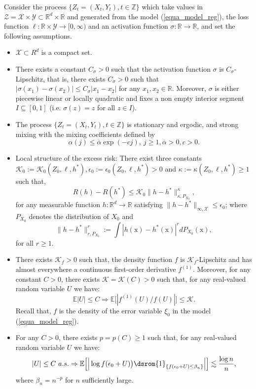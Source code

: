\documentclass[10pt,twoside]{article}
\numberwithin{equation}{section}
\newcommand{\E}{\ensuremath{\mathbb{E}}}
\newcommand{\R}{\ensuremath{\mathbb{R}}}
\newcommand{\Z}{\ensuremath{\mathbb{Z}}}
\def \ind{\textrm{\dsrom{1}}}
\newcommand{\mk}{ { \mathcal{K}} }
\newcommand{\mx}{ { \mathcal{X}} }
\begin{document}
Consider the process $\{ Z_t=(X_t, Y_t), t \in \Z \}$ which take values in $ \mathcal{Z}=   \mathcal{X} \times \mathcal{Y} \subset \R^d \times \R$ and generated from the model (\ref{equa_model_reg}), the loss function 
%
$\ell : \R \times \mathcal{Y} \to [0, \infty)$ and an activation function $\sigma: \R \rightarrow \R $, and set the following assumptions. 
%
\begin{itemize}
%
\item[\textbf{(A0)}:] $\mathcal{X}\subset R^d$ is a compact set.
%
\item[\textbf{(A1)}:] There exists a constant $C_{\sigma}>0$ such that the activation function $\sigma$ is $C_{\sigma}$-Lipschitz, that is, there exists $C_{\sigma} > 0$ such that $|\sigma(x_1) - \sigma(x_2)| \leq C_{\sigma} |x_1 - x_2|$ for any $x_1, x_2 \in \R$.
%
Moreover, $\sigma$ is  either piecewise linear or locally quadratic and fixes a non empty interior segment $I \subseteq [0,1]$ (i.e. $\sigma(z) = z$ for all $z \in I$).
%
%
\item[\textbf{(A2)}:] The process $\{Z_t = (X_t, Y_t ),  t \in \Z \}$ is stationary and ergodic, and strong mixing  with the mixing coefficients defined by
%
\begin{equation}\label{coef_alpha_mixing}
\alpha(j) \leq \overline{\alpha} \exp(-c j), ~ j \ge 1, \overline{\alpha} > 0, c > 0.
\end{equation}
%
\item[\textbf{(A3)}:] 
Local structure of the excess risk: There exist three constants $\mk_0:= \mk_0(Z_0, \ell, h^*) , \epsilon_0:= \epsilon_0(Z_0, \ell, h^*) >0$ and $\kappa:=\kappa(Z_0, \ell, h^*) \geq 1$ such that,  
%
\begin{equation}\label{assump_local_quadr}
 R(h) - R(h^*) \leq \mk_0 \| h - h^*\|^\kappa_{\kappa, P_{X_0}}, 
\end{equation}
%
for any measurable function $h: \R^d \rightarrow \R$ satisfying $\|h - h^*\|_{\infty, \mx} \leq \epsilon_0$; where $P_{X_0}$ denotes the distribution of $X_0$ and 
%
\[ \| h - h^{*}\|_{r, P_{X_0}}^r := \displaystyle \int | h (\text{x})- h^{*} (\text{x}) |^r  d P_{X_0} ( \text{x}),  
\]
%
for all $r \geq 1$.

\item[\textbf{(A4)}:] There exists $\mathcal{K}_f>0$ such that, the density function $f$ is $\mathcal{K}_f$-Lipschitz and has almost everywhere a continuous first-order derivative $f^{(1)}$.
% 
%
Moreover, for any constant $C>0$, there exists $\mathcal{K} = \mathcal{K}(C) >0$ such that, for any real-valued random variable $U$ we have:
\[ \E|U| \leq C  \Rightarrow  \E\big[ |f^{(1)}(U)/f(U)| \big] \leq \mathcal{K} .\]
%
Recall that, $f$ is the density of the error variable $\xi_0$ in the model (\ref{equa_model_reg}).
%
%
\item[\textbf{(A5)}:] For any $C > 0$, there exists $p = p(C) \ge 1$ such that, for any real-valued random variable $U$ we have: 
%
\[ |U| \leq C ~a.s.  \Rightarrow \E\Big[\Big|\log f(\epsilon_0 + U) \big) \ind_{\{f(\epsilon_0 + U) \leq \beta_n \}} \Big| \Big] \lesssim \dfrac{\log n}{n},
\]
%
where $\beta_n = n^{-p}$ for $n$ sufficiently large.
\end{itemize}
%
% 
\end{document}
